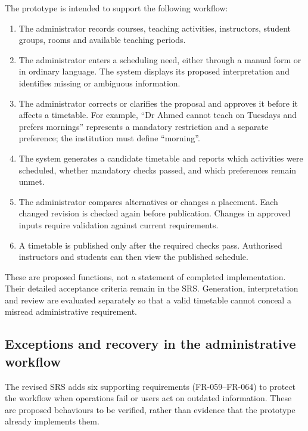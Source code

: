 \documentclass[
  11pt,a4paper,oneside]{report}
\begin{document}
The prototype is intended to support the following workflow:
\begin{enumerate}
\item The administrator records courses, teaching activities, instructors, student groups, rooms and available teaching periods.
\item The administrator enters a scheduling need, either through a manual form or in ordinary language. The system displays its proposed interpretation and identifies missing or ambiguous information.
\item The administrator corrects or clarifies the proposal and approves it before it affects a timetable. For example, ``Dr Ahmed cannot teach on Tuesdays and prefers mornings'' represents a mandatory restriction and a separate preference; the institution must define ``morning''.
\item The system generates a candidate timetable and reports which activities were scheduled, whether mandatory checks passed, and which preferences remain unmet.
\item The administrator compares alternatives or changes a placement. Each changed revision is checked again before publication. Changes in approved inputs require validation against current requirements.
\item A timetable is published only after the required checks pass. Authorised instructors and students can then view the published schedule.
\end{enumerate}
These are proposed functions, not a statement of completed implementation. Their detailed acceptance criteria remain in the SRS. Generation, interpretation and review are evaluated separately so that a valid timetable cannot conceal a misread administrative requirement.

\subsection{Exceptions and recovery in the administrative workflow}
The revised SRS adds six supporting requirements (FR-059--FR-064) to protect the workflow when operations fail or users act on outdated information. These are proposed behaviours to be verified, rather than evidence that the prototype already implements them.
\end{document}
